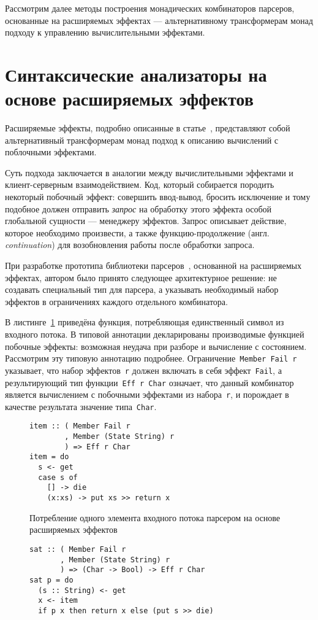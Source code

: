   Рассмотрим далее методы построения монадических комбинаторов парсеров, основанные
  на расширяемых эффектах --- альтернативному трансформерам монад подходу к управлению
  вычислительными эффектами.  

\section{Синтаксические анализаторы на основе расширяемых эффектов}

  Расширяемые эффекты, подробно описанные в статье~\cite{extEffects}, представляют
  собой альтернативный трансформерам монад подход к описанию вычислений с поблочными
  эффектами.

  Суть подхода заключается в аналогии между вычислительными эффектами и
  клиент-серверным взаимодействием. Код, который собирается породить некоторый
  побочный эффект: совершить ввод-вывод, бросить исключение и тому подобное должен
  отправить \emph{запрос} на обработку этого эффекта особой глобальной сущности
  --- менеджеру эффектов. Запрос описывает действие, которое необходимо
  произвести, а также функцию-продолжение (англ. \emph{continuation}) для
  возобновления работы после обработки запроса.

  При разработке прототипа библиотеки парсеров~\cite{extEffParsers}, основанной на расширяемых 
  эффектах, автором было принято следующее архитектурное решение: 
  не создавать специальный тип для парсера, а указывать необходимый набор эффектов 
  в ограничениях каждого отдельного комбинатора.

  В листинге~\ref{listing:extEffItem} приведёна функция, потребляющая 
  единственный символ из входного потока. В типовой аннотации декларированы
  производимые функцией побочные эффекты: возможная неудача при разборе и 
  вычисление с состоянием. Рассмотрим эту типовую аннотацию подробнее. 
  Ограничение~\lstinline{Member Fail r} указывает, что набор 
  эффектов~\lstinline{r} должен включать в себя эффект~\lstinline{Fail}, а 
  результирующий тип функции~\lstinline{Eff r Char} означает, что данный 
  комбинатор является вычислением с побочными эффектами из набора~\lstinline{r},
  и порождает в качестве результата значение типа~\lstinline{Char}. 

  \begin{figure}[h]
  \begin{lstlisting}
item :: ( Member Fail r
        , Member (State String) r
        ) => Eff r Char
item = do
  s <- get
  case s of 
    [] -> die
    (x:xs) -> put xs >> return x 
  \end{lstlisting}
  \caption{Потребление одного элемента входного потока парсером на основе 
  расширяемых эффектов}
  \label{listing:extEffItem}
  \end{figure} 

  \begin{figure}[h]
  \begin{lstlisting}
sat :: ( Member Fail r
       , Member (State String) r
       ) => (Char -> Bool) -> Eff r Char
sat p = do
  (s :: String) <- get
  x <- item
  if p x then return x else (put s >> die)
  \end{lstlisting}
  \label{listing:extEffSat}
  \end{figure} 

